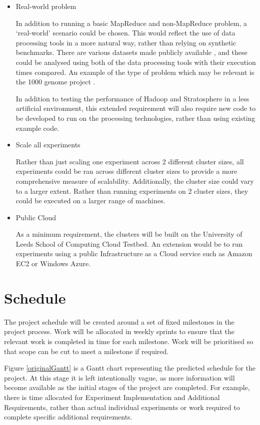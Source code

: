 \begin{itemize}
	\item Real-world problem

	In addition to running a basic MapReduce and non-MapReduce problem, a `real-world' scenario could be chosen. This would reflect the use of data processing tools in a more natural way, rather than relying on synthetic benchmarks. There are various datasets made publicly available \cite{publicAmazonData}, and these could be analysed using both of the data processing tools with their execution times compared. An example of the type of problem which may be relevant is the 1000 genome project \cite{genomeData}.

	In addition to testing the performance of Hadoop and Stratosphere in a less artificial environment, this extended requirement will also require new code to be developed to run on the processing technologies, rather than using existing example code.

	\item Scale all experiments

	Rather than just scaling one experiment across 2 different cluster sizes, all experiments could be ran across different cluster sizes to provide a more comprehensive measure of scalability. Additionally, the cluster size could vary to a larger extent. Rather than running experiments on 2 cluster sizes, they could be executed on a larger range of machines.

	\item Public Cloud

	As a minimum requirement, the clusters will be built on the University of Leeds School of Computing Cloud Testbed. An extension would be to run experiments using a public Infrastructure as a Cloud service such as Amazon EC2 or Windows Azure. 
\end{itemize}

\section{Schedule}
The project schedule will be created around a set of fixed milestones in the project process. Work will be allocated in weekly sprints to ensure that the relevant work is completed in time for each milestone. Work will be prioritised so that scope can be cut to meet a milestone if required.

Figure \ref{originalGantt} is a Gantt chart representing the predicted schedule for the project. At this stage it is left intentionally vague, as more information will become available as the initial stages of the project are completed. For example, there is time allocated for Experiment Implementation and Additional Requirements, rather than actual individual experiments or work required to complete specific additional requirements.

